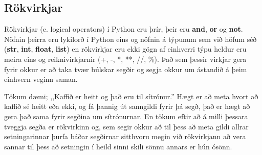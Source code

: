 \subsection{Rökvirkjar}
Rökvirkjar (e. logical operators) í Python eru þrír, þeir eru \textbf{and}, \textbf{or} og \textbf{not}.
Nöfnin þeirra eru lykilorð í Python eins og nöfnin á týpunum sem við höfum séð (\textbf{str}, \textbf{int}, \textbf{float}, \textbf{list}) en rökvirkjar eru ekki gögn af einhverri týpu heldur eru meira eins og reiknivirkjarnir (+, -, *, **, //, \%).
Það sem þessir virkjar gera fyrir okkur er að taka tvær búlskar segðir og segja okkur um ástandið á þeim einhvern veginn saman.

Tökum dæmi; ,,Kaffið er heitt og það eru til sítrónur.'' 
Hægt er að meta hvort að kaffið sé heitt eða ekki, og fá þannig út sanngildi fyrir þá segð, það er hægt að gera það sama fyrir segðina um sítrónurnar. En tökum eftir að á milli þessara tveggja segða er rökvirkinn og, sem segir okkur að til þess að meta gildi allrar setningarinnar þurfa báðar segðirnar sitthvoru megin við rökvirkjann að vera sannar til þess að setningin í heild sinni skili sönnu annars er hún ósönn.
\vspace{10pt}
